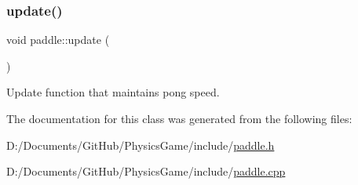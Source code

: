 \mbox{\label{classpaddle_ae20fb7dc01d0a3b92ebc49e5d132aee8}} 
\subsubsection{\texorpdfstring{update()}{update()}}
{\footnotesize\ttfamily void paddle\+::update (\begin{DoxyParamCaption}{ }\end{DoxyParamCaption})}



Update function that maintains pong speed. 



The documentation for this class was generated from the following files\+:\begin{DoxyCompactItemize}
\item 
D\+:/\+Documents/\+Git\+Hub/\+Physics\+Game/include/\hyperlink{paddle_8h}{paddle.\+h}\item 
D\+:/\+Documents/\+Git\+Hub/\+Physics\+Game/include/\hyperlink{paddle_8cpp}{paddle.\+cpp}\end{DoxyCompactItemize}
